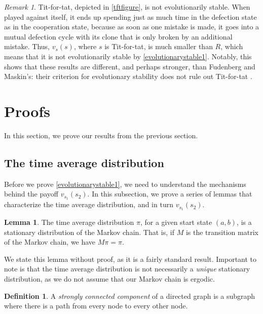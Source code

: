 \documentclass[12pt]{article}
\theoremstyle{definition}
\newtheorem{definition}[theorem]{Definition}
\newtheorem{lemma}[theorem]{Lemma}
\theoremstyle{remark}
\newtheorem*{remark}{Remark}
\begin{document}
\begin{remark}
  Tit-for-tat, depicted in \cref{tftfigure}, is not evolutionarily stable. 
  When played against itself, it ends up spending just as much time in the defection state as in the cooperation state, because as soon as one mistake is made, it goes into a mutual defection cycle with its clone that is only broken by an additional mistake.
  Thus, $v_s(s)$, where $s$ is Tit-for-tat, is much smaller than $R$, which means that it is not evolutionarily stable by \cref{evolutionarystable1}. Notably, this shows that these results are different, and perhaps stronger, than Fudenberg and Maskin's: their criterion for evolutionary stability does not rule out Tit-for-tat \cite{fundenberg1990evolution}.
\end{remark}


\section{Proofs}
\label{sectionproofs}

In this section, we prove our results from the previous section.

\subsection{The time average distribution}

Before we prove \cref{evolutionarystable1}, we need to understand the mechanisms behind the payoff $v_{s_1}(s_2)$. In this subsection, we prove a series of lemmas that characterize the time average distribution, and in turn $v_{s_1}(s_2)$.

\begin{lemma}
  \label{timeaverageisstationary}
  The time average distribution $\pi$, for a given start state $(a,b)$, is a stationary distribution of the Markov chain. That is, if $M$ is the transition matrix of the Markov chain, we have $M \pi = \pi$.
\end{lemma}

We state this lemma without proof, as it is a fairly standard result. Important to note is that the time average distribution is not necessarily a \textit{unique} stationary distribution, as we do not assume that our Markov chain is ergodic.

\begin{definition}
  A \textit{strongly connected component} of a directed graph is a subgraph where there is a path from every node to every other node.
\end{definition}
\end{document}
